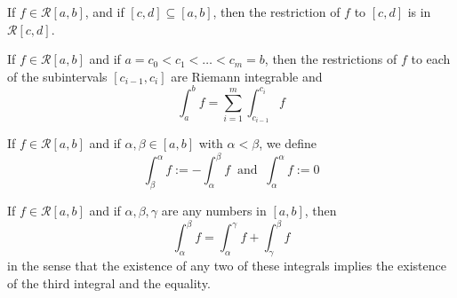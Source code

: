 \begin{corollary}
	If $f \in \mathcal{R}[a,b]$, and if $[c,d]\subseteq [a,b]$, then the restriction of $f$ to $[c,d]$ is in $\mathcal{R}[c,d]$.
\end{corollary}

\begin{corollary}
	If $f \in \mathcal{R}[a,b]$ and if $a=c_0<c_1<\dots<c_m=b$, then the restrictions of $f$ to each of the subintervals $[c_{i-1},c_i]$ are Riemann integrable and
	\[\displaystyle\int_{a}^{b}f=\sum\limits_{i=1}^{m}\displaystyle\int_{c_{i-1}}^{c_i}f\]
\end{corollary}

\begin{definition}
	If $f \in \mathcal{R}[a,b]$ and if $\alpha, \beta \in [a,b]$ with $\alpha < \beta$, we define
	\[\displaystyle\int_{\beta}^{\alpha}f:=-\displaystyle\int_{\alpha}^{\beta}f\ \text{  and  }\ \displaystyle\int_{\alpha}^{\alpha}f:=0\]
\end{definition}

\begin{theorem}
	If $f \in \mathcal{R}[a,b]$ and if $\alpha,\beta,\gamma$ are any numbers in $[a,b]$, then
	\[\displaystyle\int_{\alpha}^{\beta}f=\displaystyle\int_{\alpha}^{\gamma}f+\displaystyle\int_{\gamma}^{\beta}f\]
	in the sense that the existence of any two of these integrals implies the existence of the third integral and the equality.
\end{theorem}
